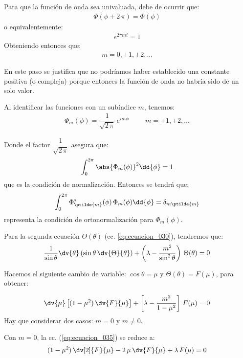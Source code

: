 Para que la función de onda sea univaluada, debe de ocurrir que:
\begin{align}
\Phi(\phi +  2 \, \pi) = \Phi(\phi)
\label{eq:ecuacion_031}
\end{align}
o equivalentemente:
\begin{align*}
e^{2 \pi m i} = 1
\end{align*}
Obteniendo entonces que:
\begin{align*}
m = 0, \pm 1, \pm 2, \ldots
\end{align*}

En este paso se justifica que no podríamos haber establecido una constante positiva (o compleja) porque entonces la función de onda no habría sido de un solo valor.
\par
Al identificar las funciones con un subíndice $m$, tenemos:
\begin{align}
\Phi_{m}(\phi) = \dfrac{1}{\sqrt{2 \, \pi}} \, e^{i m \phi} \hspace{1cm} m = \pm 1, \pm 2, \ldots
\label{eq:ecuacion_032}
\end{align}

Donde el factor $\dfrac{1}{\sqrt{2 \, \pi}}$ asegura que:
\begin{align*}
\int_{0}^{2 \pi} \abs{\Phi_{m}(\phi)}^{2} \dd{\phi} = 1
\end{align*}
que es la condición de normalización. Entonces se tendrá que:
\begin{align}
\int_{0}^{2 \pi} \Phi_{\ptilde{m}}^{*}(\phi) \, \Phi_{m}(\phi) \dd{\phi} = \delta_{m \ptilde{m}}
\label{eq:ecuacion_033}
\end{align}
representa la condición de ortonormalización para $\Phi_{m}(\phi)$.
\par
Para la segunda ecuación $\Theta (\theta)$ (ec. \ref{eq:ecuacion_030}), tendremos que:
\fontsize{12}{12}\selectfont
\begin{align}
\dfrac{1}{\sin \theta} \dv{\theta} \left( \sin \theta \, \dv{\Theta}{\theta} \right) + \left( \lambda - \dfrac{m^{2}}{\sin^{2} \theta} \right) \, \Theta (\theta) = 0
\label{eq:ecuacion_034}
\end{align}

Hacemos el siguiente cambio de variable: $\cos \theta = \mu$ y $\Theta(\theta) = F(\mu)$, para obtener:

\begin{align}
\dv{\mu} \left[ (1 - \mu^{2}) \, \dv{F}{\mu} \right] + \left[ \lambda - \dfrac{m^{2}}{1 - \mu^{2}} \right] \, F(\mu) = 0
\label{eq:ecuacion_035}
\end{align}
Hay que considerar dos casos: $m = 0$ y $m \neq 0$. 
\par
Con $m = 0$, la ec. (\ref{eq:ecuacion_035}) se reduce a:
\begin{align}
(1 - \mu^{2}) \, \dv[2]{F}{\mu} - 2  \, \mu \, \dv{F}{\mu} + \lambda \, F(\mu) = 0
\label{eq:ecuacion_036}
\end{align}

